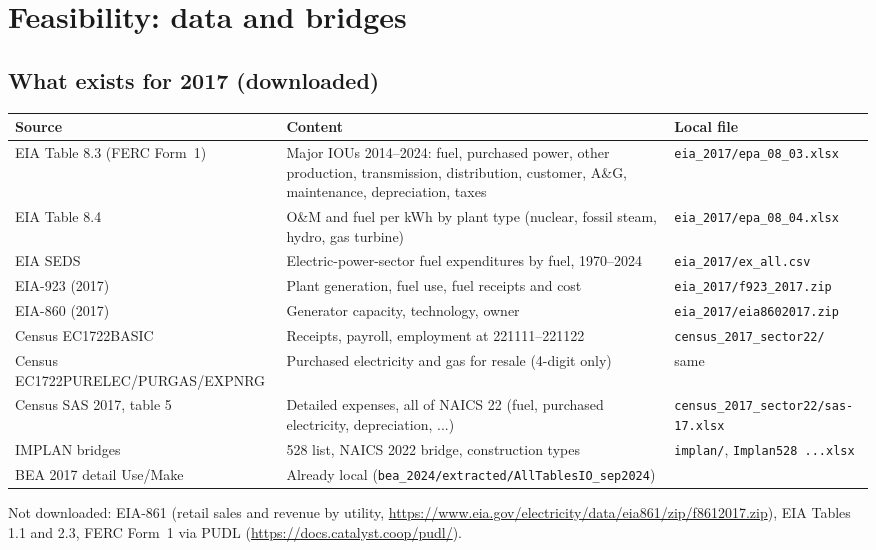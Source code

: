 \documentclass[11pt]{article}
\begin{document}
\section{Feasibility: data and bridges}\label{sec:feas}

\subsection{What exists for 2017 (downloaded)}
\begin{center}\footnotesize
\begin{tabular}{p{4.2cm}p{6.2cm}p{4.6cm}}
\toprule
Source & Content & Local file \\
\midrule
EIA Table 8.3 (FERC Form~1) & Major IOUs 2014--2024: fuel, purchased power, other production, transmission, distribution, customer, A\&G, maintenance, depreciation, taxes & \texttt{eia\_2017/epa\_08\_03.xlsx} \\
EIA Table 8.4 & O\&M and fuel per kWh by plant type (nuclear, fossil steam, hydro, gas turbine) & \texttt{eia\_2017/epa\_08\_04.xlsx} \\
EIA SEDS & Electric-power-sector fuel expenditures by fuel, 1970--2024 & \texttt{eia\_2017/ex\_all.csv} \\
EIA-923 (2017) & Plant generation, fuel use, fuel receipts and cost & \texttt{eia\_2017/f923\_2017.zip} \\
EIA-860 (2017) & Generator capacity, technology, owner & \texttt{eia\_2017/eia8602017.zip} \\
Census EC1722BASIC & Receipts, payroll, employment at 221111--221122 & \texttt{census\_2017\_sector22/} \\
Census EC1722PURELEC/PURGAS/EXPNRG & Purchased electricity and gas for resale (4-digit only) & same \\
Census SAS 2017, table 5 & Detailed expenses, all of NAICS 22 (fuel, purchased electricity, depreciation, ...) & \texttt{census\_2017\_sector22/sas-17.xlsx} \\
IMPLAN bridges & 528 list, NAICS 2022 bridge, construction types & \texttt{implan/}, \texttt{Implan528 ...xlsx} \\
BEA 2017 detail Use/Make & Already local (\texttt{bea\_2024/extracted/AllTablesIO\_sep2024}) & \\
\bottomrule
\end{tabular}
\end{center}
Not downloaded: EIA-861 (retail sales and revenue by utility, \url{https://www.eia.gov/electricity/data/eia861/zip/f8612017.zip}), EIA Tables 1.1 and 2.3, FERC Form~1 via PUDL (\url{https://docs.catalyst.coop/pudl/}).
\end{document}
